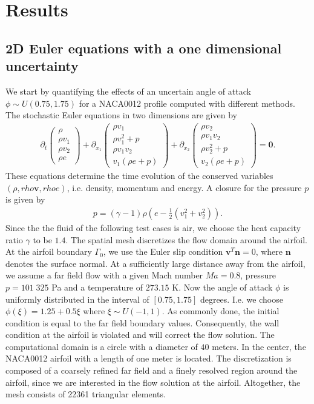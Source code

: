 \section{Results}
\label{sec:results}

\subsection{2D Euler equations with a one dimensional uncertainty}
We start by quantifying the effects of an uncertain angle of attack $\phi\sim U(0.75,1.75)$ for a NACA0012 profile computed with different methods. The stochastic Euler equations in two dimensions are given by
\begin{align*}
\partial_t
\begin{pmatrix}
\rho \\ \rho v_1 \\ \rho v_2 \\ \rho e
\end{pmatrix}
+\partial_{x_1}
\begin{pmatrix}
\rho v_1 \\ \rho v_1^2 +p \\ \rho v_1 v_2 \\  v_1 (\rho e+p)
\end{pmatrix}
+\partial_{x_2}
\begin{pmatrix}
\rho v_2 \\ \rho v_1 v_2 \\ \rho v_2^2+p \\ v_2 (\rho e+p)
\end{pmatrix}
=\bm{0}.
\end{align*}
These equations determine the time evolution of the conserved variables $(\rho,rho \bm v, rho e)$, i.e. density, momentum and energy. A closure for the pressure $p$ is given by
\begin{align*}
p = (\gamma-1)\rho\left(e-\frac12(v_1^2+v_2^2)\right).
\end{align*}
Since the the fluid of the following test cases is air, we choose the heat capacity ratio $\gamma$ to be $1.4$. The spatial mesh discretizes the flow domain around the airfoil. At the airfoil boundary $\Gamma_{0}$, we use the Euler slip condition $\bm v^T\bm n = 0$, where $\bm n$ denotes the surface normal. At a sufficiently large distance away from the airfoil, we assume a far field flow with a given Mach number $Ma = 0.8$, pressure $p = 101\;325$ Pa and a temperature of $273.15$ K. Now the angle of attack $\phi$ is uniformly distributed in the interval of $[0.75,1.75]$ degrees. I.e. we choose $\phi(\xi) = 1.25 + 0.5\xi$ where $\xi\sim U(-1,1)$. As commonly done, the initial condition is equal to the far field boundary values. Consequently, the wall condition at the airfoil is violated and will correct the flow solution. The computational domain is a circle with a diameter of $40$ meters. In the center, the NACA0012 airfoil with a length of one meter is located. The discretization is composed of a coarsely refined far field and a finely resolved region around the airfoil, since we are interested in the flow solution at the airfoil. Altogether, the mesh consists of 22361 triangular elements.


